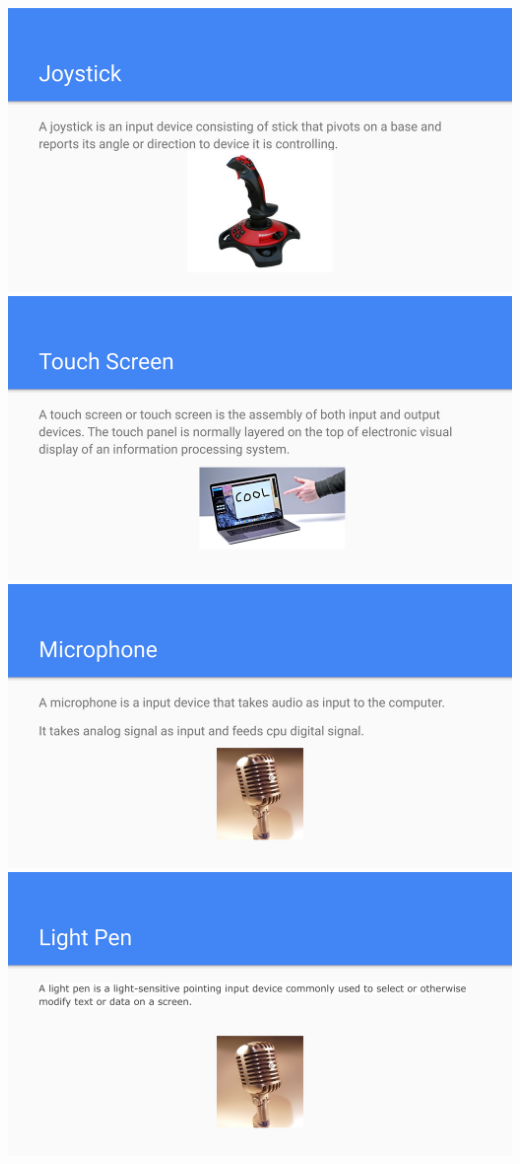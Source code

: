 \documentclass[17pt,a4paper,oneside,margin=1in]{article}
\begin{document}
\begin{center}
	\includegraphics[width=0.7\linewidth]{./scrot/input-4.png}
	\includegraphics[width=0.7\linewidth]{./scrot/input-5.png}
	\includegraphics[width=0.7\linewidth]{./scrot/input-6.png}
	\includegraphics[width=0.7\linewidth]{./scrot/input-7.png}
\end{center}
\end{document}
